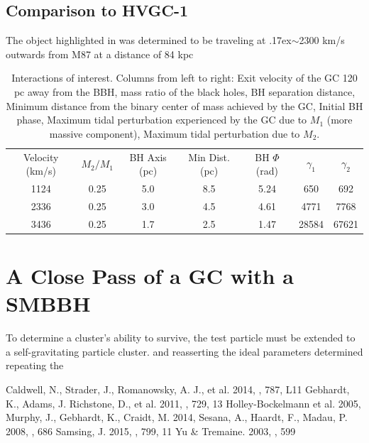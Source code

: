 \documentclass{aastex62}
\begin{document}
\subsection{Comparison to HVGC-1}
The object highlighted in \citet{cald14} was determined to be traveling at {\raise.17ex\hbox{$\scriptstyle\mathtt{\sim}$}}2300 km/s outwards from M87 at a distance of 84 kpc
\begin{table}
\centering
\caption{Interactions of interest. Columns from left to right: Exit velocity of the GC 120 pc away from the BBH, mass ratio of the black holes, BH separation distance, Minimum distance from the binary center of mass achieved by the GC, Initial BH phase, Maximum tidal perturbation experienced by the GC due to $M_{1}$ (more massive component), Maximum tidal perturbation due to $M_{2}$. \label{results}}

\begin{tabular}{ccccccc}
\hline \hline
Velocity (km/s) & $M_{2}/M_{1}$ & BH Axis (pc) & Min Dist. (pc) & BH $\Phi$ (rad) & $\gamma_{1}$ & $\gamma_{2}$  \\
1124 & 0.25 & 5.0 & 8.5 & 5.24 & 650 & 692 \\
2336 & 0.25 & 3.0 & 4.5 & 4.61 & 4771 & 7768 \\
3436 & 0.25 & 1.7 & 2.5 & 1.47 & 28584 & 67621 \\
\end{tabular}
\end{table}

\section{A Close Pass of a GC with a SMBBH}
To determine a cluster's ability to survive, the test particle must be extended to a self-gravitating particle cluster.  and reasserting the ideal parameters determined  repeating the 

\begin{thebibliography}{}
Caldwell, N., Strader, J., Romanowsky, A. J., et al. 2014, \apjl, 787, L11
Gebhardt, K., Adams, J. Richstone, D., et al. 2011, \apj, 729, 13
Holley-Bockelmann et al. 2005, \apjl
{}
Murphy, J., Gebhardt, K., Craidt, M. 2014, \apj
{}
Sesana, A., Haardt, F., Madau, P. 2008, \apj, 686
Samsing, J. 2015, \apj, 799, 11
Yu \& Tremaine. 2003, \apj, 599
\end{thebibliography}
\end{document}

